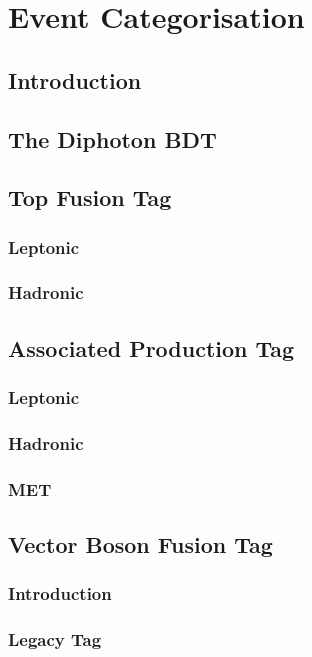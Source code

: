 \chapter{Event Categorisation}
\label{chap:event_select}

\newpage
\section{Introduction}


\section{The Diphoton BDT}


\section{Top Fusion Tag}

\subsection{Leptonic}
\subsection{Hadronic}


\section{Associated Production Tag}

\subsection{Leptonic}
\subsection{Hadronic}
\subsection{MET}


\section{Vector Boson Fusion Tag}

\subsection{Introduction}
\subsection{Legacy Tag}

